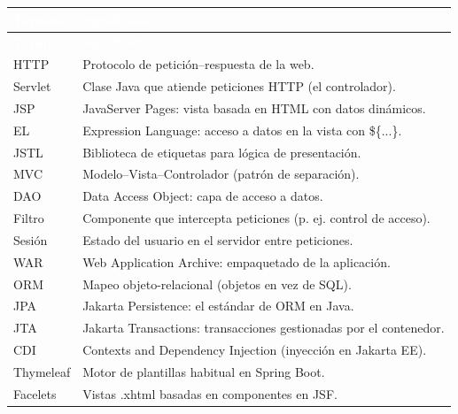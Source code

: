 \documentclass[11pt]{article}
\begin{document}
{\renewcommand{\arraystretch}{1.25}
\begin{longtable}{>{\raggedright\arraybackslash}p{3cm} >{\raggedright\arraybackslash}p{12.4cm}}
\rowcolor{jwebazul}\textcolor{white}{\textbf{Término}} & \textcolor{white}{\textbf{Significado}} \\
\endfirsthead
\rowcolor{jwebazul}\textcolor{white}{\textbf{Término}} & \textcolor{white}{\textbf{Significado}} \\
\endhead
\ttfamily\color{jwebazul}HTTP & Protocolo de petición–respuesta de la web. \\ \hline
\ttfamily\color{jwebazul}Servlet & Clase Java que atiende peticiones HTTP (el controlador). \\ \hline
\ttfamily\color{jwebazul}JSP & JavaServer Pages: vista basada en HTML con datos dinámicos. \\ \hline
\ttfamily\color{jwebazul}EL & Expression Language: acceso a datos en la vista con \$\{...\}. \\ \hline
\ttfamily\color{jwebazul}JSTL & Biblioteca de etiquetas para lógica de presentación. \\ \hline
\ttfamily\color{jwebazul}MVC & Modelo–Vista–Controlador (patrón de separación). \\ \hline
\ttfamily\color{jwebazul}DAO & Data Access Object: capa de acceso a datos. \\ \hline
\ttfamily\color{jwebazul}Filtro & Componente que intercepta peticiones (p. ej. control de acceso). \\ \hline
\ttfamily\color{jwebazul}Sesión & Estado del usuario en el servidor entre peticiones. \\ \hline
\ttfamily\color{jwebazul}WAR & Web Application Archive: empaquetado de la aplicación. \\ \hline
\ttfamily\color{jwebazul}ORM & Mapeo objeto-relacional (objetos en vez de SQL). \\ \hline
\ttfamily\color{jwebazul}JPA & Jakarta Persistence: el estándar de ORM en Java. \\ \hline
\ttfamily\color{jwebazul}JTA & Jakarta Transactions: transacciones gestionadas por el contenedor. \\ \hline
\ttfamily\color{jwebazul}CDI & Contexts and Dependency Injection (inyección en Jakarta EE). \\ \hline
\ttfamily\color{jwebazul}Thymeleaf & Motor de plantillas habitual en Spring Boot. \\ \hline
\ttfamily\color{jwebazul}Facelets & Vistas .xhtml basadas en componentes en JSF. \\ \hline
\end{longtable}}
\end{document}
